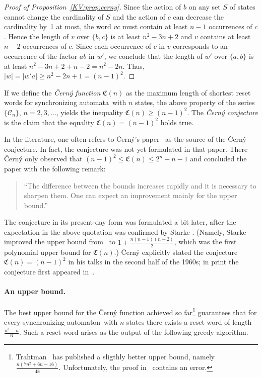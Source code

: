 \documentclass{irmaart}
\newcommand{\sa}{synchronizing au\-tom\-a\-ta}
\newcommand{\san}{synchronizing au\-tom\-a\-ton}
\theoremstyle{plain}
\begin{document}
\begin{proof}[Proof of Proposition~\ref{KV:prop:cerny}]
Since the action of $b$ on any set $S$ of states cannot change the cardinality of $S$ and the action of $c$ can decrease the cardinality
by~1 at most, the word $vc$ must contain at least $n-1$ occurrences of $c$. Hence the length of $v$ over $\{b,c\}$ is at least $n^2-3n+2$
and $v$ contains at least $n-2$ occurrences of $c$. Since each occurrence of $c$ in $v$ corresponds to an occurrence of the factor $ab$ in
$w'$, we conclude that the length of $w'$ over $\{a,b\}$ is at least $n^2-3n+2+n-2=n^2-2n$. Thus, $|w|=|w'a|\ge n^2-2n+1=(n-1)^2$.
\end{proof}

If we define the \emph{\v{C}ern\'y function} $\mathfrak{C}(n)$ as the maximum length of shortest reset words for
\sa\ with $n$ states, the above property of the series $\{\mathcal{C}_{n}\}$,
$n=2,3,\dotsc$, yields the inequality $\mathfrak{C}(n)\ge(n-1)^2$. The
\emph{\v{C}ern\'{y} conjecture} is the
claim that the equality $\mathfrak{C}(n)=(n-1)^2$ holds true.

In the literature, one often refers to \v{C}ern\'{y}'s paper~\cite{Cerny:1964}
as the source of the \v{C}ern\'{y} conjecture. In fact, the conjecture was not
yet formulated in that paper. There \v{C}ern\'{y} only observed that
$(n-1)^2\le \mathfrak{C}(n)\le 2^n-n-1$ and concluded the paper with the
following remark:
\begin{quote}
``The difference between the bounds increases rapidly and it is necessary to
sharpen them. One can expect an improvement mainly for the upper bound.''
\end{quote}
The conjecture in its present-day form was formulated a bit later, after the
expectation in the above quotation was confirmed by Starke \cite{Starke:1966}.
(Namely, Starke improved the upper bound from~\cite{Cerny:1964} to
$1+\frac{n(n-1)(n-2)}2$, which was the first polynomial upper bound for
$\mathfrak{C}(n)$.) \v{C}ern\'{y} explicitly stated the conjecture
$\mathfrak{C}(n)=(n-1)^2$ in his talks in the second half of the 1960s; in
print the conjecture first appeared in~\cite{Cerny&Piricka&Rosenauerova:1971}.

\paragraph*{An upper bound.} The best upper bound for the \v{C}ern\'{y}
function achieved so far\footnote{Trahtman~\cite{Trahtman:2011} has published a
sligthly better upper bound, namely $\frac{n(7n^2+6n-16)}{48}$. Unfortunately,
the proof in~\cite{Trahtman:2011} contains an error.} guarantees that for every
\san\ with $n$ states there exists a reset word of length $\frac{n^3-n}6$. Such
a reset word arises as the output of the following greedy
algorithm.
\end{document}
